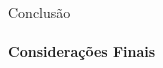 
\begin{frame}[t]{Conclusão}
    \framesubtitle{Considerações Finais}
    \begin{figure}
    \end{figure}
\end{frame}